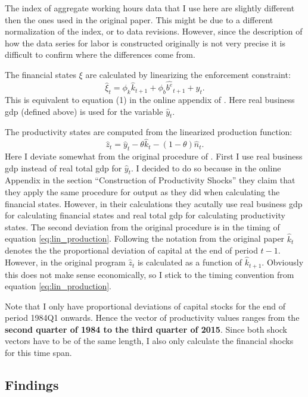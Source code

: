 The index of aggregate working hours data that I use here are slightly
different then the ones used in the original paper. This might be due to a
different normalization of the index, or to data revisions. However, since the
description of how the data series for labor is constructed originally is not
very precise it is difficult to confirm where the differences come from.

The financial states \( \xi \) are calculated by linearizing the enforcement
constraint:
\begin{equation}
\label{eq:fin_shock_correct_timing}
    \hat{\xi}_t = \phi_k \hat{k}_{t+1} + \phi_b \hat{b^e}_{t+1} + \hat{y}_t.
\end{equation}
This is equivalent to equation (1) in the online appendix of
\textcite{jerman_macroeconomic_2012}. Here real business gdp (defined above) is
used for the variable \(\hat{y}_t\).

The productivity states are computed from the linearized production function:
\begin{equation}
\label{eq:lin_production}
    \hat{z}_t = \hat{y}_t - \theta \hat{k}_t - (1 - \theta) \hat{n}_t.
\end{equation}
Here I deviate somewhat from the original procedure of
\citeauthor{jerman_macroeconomic_2012}. First I use real business gdp instead
of real total gdp for \(\hat{y}_t\). I decided to do so because in the online
Appendix in the section ``Construction of Productivity Shocks'' they claim that
they apply the same procedure for output as they did when calculating the
financial states. However, in their calculations they acutally use real
business gdp for calculating financial states and real total gdp for
calculating productivity states. The second deviation from the original
procedure is in the timing of equation \ref{eq:lin_production}. Following the
notation from the original paper \(\hat{k}_t\) denotes the the proportional
deviation of capital at the end of period \(t - 1\). However, in the original
program \(\hat{z}_t\) is calculated as a function of \(\hat{k}_{t +
  1}\). Obviously this does not make sense economically, so I stick to the
timing convention from equation \ref{eq:lin_production}.

Note that I only have proportional deviations of capital stocks for the end of
period 1984Q1 onwards. Hence the vector of productivity values ranges from the
\textbf{second quarter of 1984 to the third quarter of 2015}. Since both shock
vectors have to be of the same length, I also only calculate the financial
shocks for this time span.


%         

\subsection{Findings}
\label{sec:findings}


\blindtext